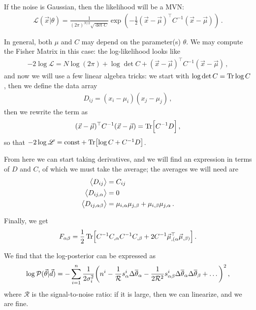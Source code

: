 \documentclass[main.tex]{subfiles}
\begin{document}
If the noise is Gaussian, then the likelihood will be a MVN: 
%
\begin{align}
\mathscr{L}(\vec{x} | \theta ) = \frac{1}{(2 \pi )^{N/2} \sqrt{\det C}}
\exp(- \frac{1}{2} (\vec{x} - \vec{\mu})^{\top} C^{-1} (\vec{x} - \vec{\mu}))
\,.
\end{align}

In general, both \(\mu \) and \(C\) may depend on the parameter(s) \(\theta \). We may compute the Fisher Matrix in this case: the log-likelihood looks like 
%
\begin{align}
-2 \log \mathscr{L} = N \log (2 \pi ) + \log \det C
+ (\vec{x} - \vec{\mu})^{\top} C^{-1} (\vec{x} - \vec{\mu})
\,,
\end{align}
%
and now we will use a few linear algebra tricks: we start with \(\log \det C = \Tr \log C\), then we define the data array 
%
\begin{align}
D_{ij} = (x_i - \mu _i)(x_j - \mu _j)
\,,
\end{align}
%
then we rewrite the term as 
%
\begin{align}
(\vec{x} - \vec{\mu})^{\top} C^{-1} (\vec{x} - \vec{\mu})
= \Tr [C^{-1} D]
\,,
\end{align}
%
so that \(-2 \log \mathscr{L} = \text{const} + \Tr[\log C + C^{-1} D]\). 

From here we can start taking derivatives, and we will find an expression in terms of \(D\) and \(C\), of which we must take the average; the averages we will need are 
%
\begin{align}
\expval{D_{ij}} &= C_{ij}  \\
\expval{D_{ij, \alpha }} &= 0 \\
\expval{D_{ij, \alpha \beta }} &= \mu_{i, \alpha } \mu_{j, \beta } + \mu_{i, \beta } \mu_{j, \alpha } 
\,.
\end{align}

Finally, we get 
%
\begin{align}
F_{\alpha \beta } = \frac{1}{2} \Tr[C^{-1} C_{,\alpha} C^{-1} C_{, \beta } + 2 C^{-1} \vec{\mu}^{\top}_{, (\alpha } \vec{\mu}_{,\beta) }]
\,.
\end{align}

We find that the log-posterior can be expressed as 
%
\begin{align}
\log \mathcal{P}(\vec{\theta} | \vec{d}) = - \sum _{i=1}^{n} \frac{1}{2 \sigma _i^2} \qty(n^i - \frac{1}{\mathcal{R}} s^{i}_{\alpha } \Delta \overline{\theta}_\alpha  - \frac{1}{2 \mathcal{R}^2} s^{i}_{\alpha \beta } \Delta \overline{\theta}_\alpha \Delta \overline{\theta}_\beta + \dots)^2
\,,
\end{align}
%
where \(\mathcal{R}\) is the signal-to-noise ratio: if it is large, then we can linearize, and we are fine. 

\end{document}
